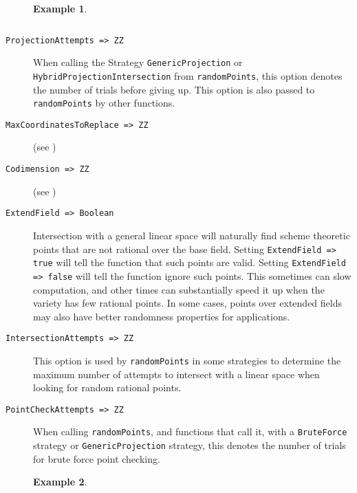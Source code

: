 \documentclass[11pt]{amsart}
\theoremstyle{definition}
\newtheorem{example}{Example}[section]
\begin{document}
\begin{description}
\begin{example}
{{\begin{verbatim}
	\end{verbatim}
	}}
	\end{example}
		
	\item[\tt ProjectionAttempts => ZZ] 

	When calling the Strategy {\tt GenericProjection} or \\
	{\tt HybridProjectionIntersection} from {\tt randomPoints}, this option denotes the number of trials before giving up.  This option is also passed to {\tt randomPoints} by other functions.

	\vspace{1em}
	\item[\tt MaxCoordinatesToReplace => ZZ] (see )
	\vspace{1em}
	\item[\tt Codimension => ZZ] (see )

	\vspace{1em}
	\item[\tt ExtendField => Boolean] 

	Intersection with a general linear space will naturally find scheme theoretic points that are not rational over the base field.  
	Setting {\tt ExtendField => true} will tell the function that such points are valid.  Setting {\tt ExtendField => false} will tell the function ignore such points.  This sometimes can slow computation, and other times can substantially speed it up when the variety has few rational points.  In some cases, points over extended fields may also have better randomness properties for applications.

	\vspace{1em}
	\item[\tt IntersectionAttempts => ZZ]

	This option is used by {\tt randomPoints} in some strategies to determine the maximum number of attempts to intersect with a linear space when looking for random rational points.  %

	\vspace{1em}
	\item[\tt PointCheckAttempts => ZZ]

	When calling {\tt randomPoints}, and functions that call it, with a {\tt BruteForce} strategy or {\tt GenericProjection} strategy, this denotes the number of trials for brute force point checking.
	
		
	\begin{example}
		

\end{example}
\end{description}
\end{document}

